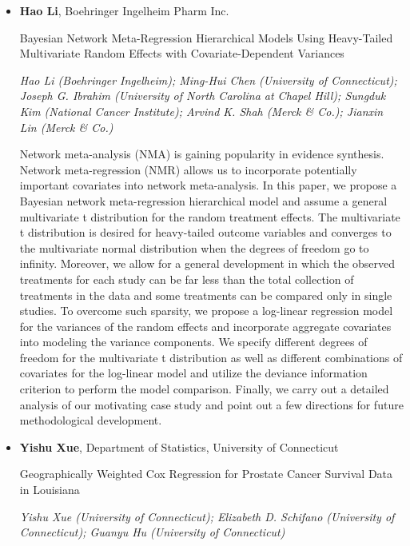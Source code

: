 \begin{itemize}
\item \textbf{Hao Li}, Boehringer Ingelheim Pharm Inc.

Bayesian Network Meta-Regression Hierarchical Models Using Heavy-Tailed Multivariate Random Effects with Covariate-Dependent Variances

\emph{\footnotesize Hao Li (Boehringer Ingelheim); Ming-Hui Chen (University of Connecticut); Joseph G. Ibrahim (University of North Carolina at Chapel Hill); Sungduk Kim (National Cancer Institute); Arvind K. Shah (Merck \& Co.); Jianxin Lin (Merck \& Co.)}

Network meta-analysis (NMA) is gaining popularity in evidence synthesis. Network meta-regression (NMR) allows us to incorporate potentially important covariates into network meta-analysis. In this paper, we propose a Bayesian network meta-regression hierarchical model and assume a general multivariate t distribution for the random treatment effects. The multivariate t distribution is desired for heavy-tailed outcome variables and converges to the multivariate normal distribution when the degrees of freedom go to infinity. Moreover, we allow for a general development in which the observed treatments for each study can be far less than the total collection of treatments in the data and some treatments can be compared only in single studies. To overcome such sparsity, we propose a log-linear regression model for the variances of the random effects and incorporate aggregate covariates into modeling the variance components. We specify different degrees of freedom for the multivariate t distribution as well as different combinations of covariates for the log-linear model and utilize the deviance information criterion to perform the model comparison. Finally, we carry out a detailed analysis of our motivating case study and point out a few directions for future methodological development.

\item \textbf{Yishu Xue}, Department of Statistics, University of Connecticut

Geographically Weighted Cox Regression for Prostate Cancer Survival Data in Louisiana

\emph{\footnotesize Yishu Xue (University of Connecticut); Elizabeth D. Schifano (University of Connecticut); Guanyu Hu (University of Connecticut)}


\end{itemize}
